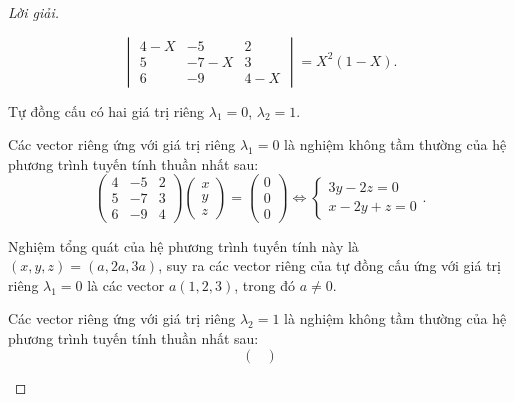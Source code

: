 \documentclass[class=linearalgebra,crop=false]{standalone}
\begin{document}
\begin{proof}[Lời giải]
\begin{enumerate}[label = (\alph*)]
              \[
                  \begin{vmatrix}
                      4 - X & -5     & 2     \\
                      5     & -7 - X & 3     \\
                      6     & -9     & 4 - X
                  \end{vmatrix}
                  = X^{2}(1 - X).
              \]
              \par Tự đồng cấu có hai giá trị riêng $\lambda_{1} = 0$, $\lambda_{2} = 1$.
              \par Các vector riêng ứng với giá trị riêng $\lambda_{1} = 0$ là nghiệm không tầm thường của hệ phương trình tuyến tính thuần nhất sau:
              \[
                  \begin{pmatrix}
                      4 & -5 & 2 \\
                      5 & -7 & 3 \\
                      6 & -9 & 4
                  \end{pmatrix}
                  \begin{pmatrix}
                      x \\
                      y \\
                      z
                  \end{pmatrix}
                  =
                  \begin{pmatrix}
                      0 \\
                      0 \\
                      0
                  \end{pmatrix}
                  \Longleftrightarrow
                  \begin{cases}
                      3y - 2z = 0 \\
                      x - 2y + z = 0
                  \end{cases}.
              \]
              \par Nghiệm tổng quát của hệ phương trình tuyến tính này là $(x, y, z) = (a, 2a, 3a)$, suy ra các vector riêng của tự đồng cấu ứng với giá trị riêng $\lambda_{1} = 0$ là các vector $a(1, 2, 3)$, trong đó $a \ne 0$.
              \bigskip
              \par Các vector riêng ứng với giá trị riêng $\lambda_{2} = 1$ là nghiệm không tầm thường của hệ phương trình tuyến tính thuần nhất sau:
              \[
                  \begin{pmatrix}

\end{pmatrix}\]
\end{enumerate}
\end{proof}
\end{document}
